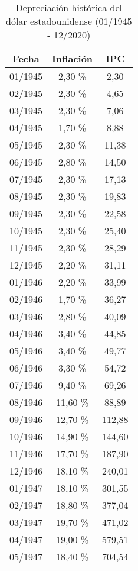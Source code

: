 \begin{center}
\begin{longtable}{|c|c|c|}
\caption{Depreciación histórica del dólar estadounidense (01/1945 - 12/2020)}
\label{tab:depreciacion-dolar} \\
\hline
\textbf{Fecha} & \textbf{Inflación} & \textbf{IPC} \\ \hline
01/1945 & 2,30 \% & 2,30 \\ \hline
02/1945 & 2,30 \% & 4,65 \\ \hline
03/1945 & 2,30 \% & 7,06 \\ \hline
04/1945 & 1,70 \% & 8,88 \\ \hline
05/1945 & 2,30 \% & 11,38 \\ \hline
06/1945 & 2,80 \% & 14,50 \\ \hline
07/1945 & 2,30 \% & 17,13 \\ \hline
08/1945 & 2,30 \% & 19,83 \\ \hline
09/1945 & 2,30 \% & 22,58 \\ \hline
10/1945 & 2,30 \% & 25,40 \\ \hline
11/1945 & 2,30 \% & 28,29 \\ \hline
12/1945 & 2,20 \% & 31,11 \\ \hline
01/1946 & 2,20 \% & 33,99 \\ \hline
02/1946 & 1,70 \% & 36,27 \\ \hline
03/1946 & 2,80 \% & 40,09 \\ \hline
04/1946 & 3,40 \% & 44,85 \\ \hline
05/1946 & 3,40 \% & 49,77 \\ \hline
06/1946 & 3,30 \% & 54,72 \\ \hline
07/1946 & 9,40 \% & 69,26 \\ \hline
08/1946 & 11,60 \% & 88,89 \\ \hline
09/1946 & 12,70 \% & 112,88 \\ \hline
10/1946 & 14,90 \% & 144,60 \\ \hline
11/1946 & 17,70 \% & 187,90 \\ \hline
12/1946 & 18,10 \% & 240,01 \\ \hline
01/1947 & 18,10 \% & 301,55 \\ \hline
02/1947 & 18,80 \% & 377,04 \\ \hline
03/1947 & 19,70 \% & 471,02 \\ \hline
04/1947 & 19,00 \% & 579,51 \\ \hline
05/1947 & 18,40 \% & 704,54 \\ \hline

\end{longtable}
\end{center}
